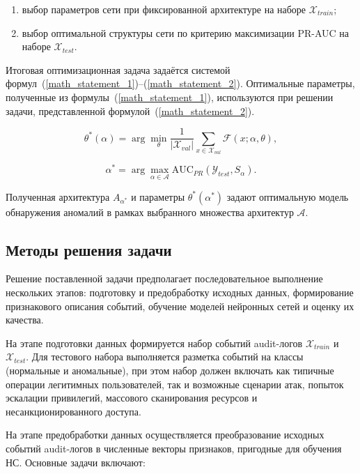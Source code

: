 \begin{enumerate}
    \item выбор параметров сети при фиксированной архитектуре на наборе $\mathcal{X}_{train}$;
    \item выбор оптимальной структуры сети по критерию максимизации PR-AUC на наборе $\mathcal{X}_{test}$.
\end{enumerate}


Итоговая оптимизационная задача задаётся системой формул~(\ref{math_statement_1})–(\ref{math_statement_2}). Оптимальные параметры, полученные из формулы~(\ref{math_statement_1}), используются при решении задачи, представленной формулой~(\ref{math_statement_2}).

\begin{equation}\label{math_statement_1}
   \theta^*(\alpha) = \arg\min_{\theta} \frac{1}{|\mathcal{X}_{val}|} \sum_{x \in \mathcal{X}_{val}} \mathcal{F}(x; \alpha, \theta),
\end{equation}

\begin{equation}\label{math_statement_2}
   \alpha^* =\arg\max_{\alpha \in \mathcal{A}}\mathrm{AUC}_{PR}(\mathcal{Y}_{test}, S_\alpha).
\end{equation}

Полученная архитектура $A_{\alpha^*}$ и параметры $\theta^*(\alpha^*)$ задают оптимальную модель обнаружения аномалий в рамках выбранного множества архитектур $\mathcal{A}$.

\subsection{Методы решения задачи}

Решение поставленной задачи предполагает последовательное выполнение нескольких этапов: подготовку и предобработку исходных данных, формирование признакового описания событий, обучение моделей нейронных сетей и оценку их качества.

На этапе подготовки данных формируется набор событий audit-логов $\mathcal{X}_{train}$ и $\mathcal{X}_{test}$. Для тестового набора выполняется разметка событий на классы (нормальные и аномальные), при этом набор должен включать как типичные операции легитимных пользователей, так и возможные сценарии атак, попыток эскалации привилегий, массового сканирования ресурсов и несанкционированного доступа.

На этапе предобработки данных осуществляется преобразование исходных событий audit-логов в численные векторы признаков, пригодные для обучения НС. Основные задачи включают:


